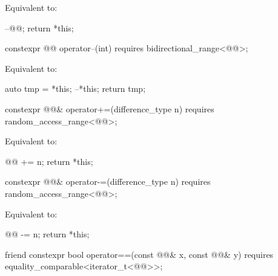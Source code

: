 \begin{itemdescr}
\pnum
\effects
Equivalent to:
\begin{codeblock}
--@@;
return *this;
\end{codeblock}
\end{itemdescr}

%
\begin{itemdecl}
constexpr @@ operator--(int) requires bidirectional_range<@@>;
\end{itemdecl}

\begin{itemdescr}
\pnum
\effects
Equivalent to:
\begin{codeblock}
auto tmp = *this;
--*this;
return tmp;
\end{codeblock}
\end{itemdescr}

%
\begin{itemdecl}
constexpr @@& operator+=(difference_type n)
  requires random_access_range<@@>;
\end{itemdecl}

\begin{itemdescr}
\pnum
\effects
Equivalent to:
\begin{codeblock}
@@ += n;
return *this;
\end{codeblock}
\end{itemdescr}

%
\begin{itemdecl}
constexpr @@& operator-=(difference_type n)
  requires random_access_range<@@>;
\end{itemdecl}

\begin{itemdescr}
\pnum
\effects
Equivalent to:
\begin{codeblock}
@@ -= n;
return *this;
\end{codeblock}
\end{itemdescr}

%
\begin{itemdecl}
friend constexpr bool operator==(const @@& x, const @@& y)
  requires equality_comparable<iterator_t<@@>>;
\end{itemdecl}

